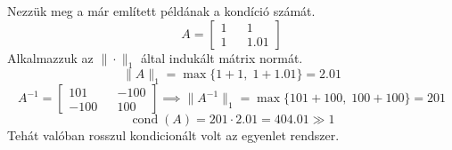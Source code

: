 \begin{pelda}
    Nezzük meg a már említett példának a kondíció számát.
    \begin{equation*}
    A = \begin{bmatrix}
        1 && 1  \\
        1 && 1.01
    \end{bmatrix}
    \end{equation*}
    Alkalmazzuk az $\| \cdot \|_{1}$ által indukált mátrix normát.
    \begin{equation*}
        \| A \| _{1} = \max \{1 + 1, \; 1 + 1.01\} = 2.01
    \end{equation*}
    \begin{equation*}
        A^{-1} =
        \begin{bmatrix}
            101 && -100 \\
            -100 && 100
        \end{bmatrix}
        \implies \| A^{-1} \| _{1} = \max \{101 + 100, \; 100 + 100 \} = 201
    \end{equation*}
    \begin{equation*}
        \operatorname{cond}(A) = 201 \cdot 2.01 = 404.01 \gg 1
    \end{equation*}
    Tehát valóban rosszul kondicionált volt az egyenlet rendszer.

\end{pelda}



